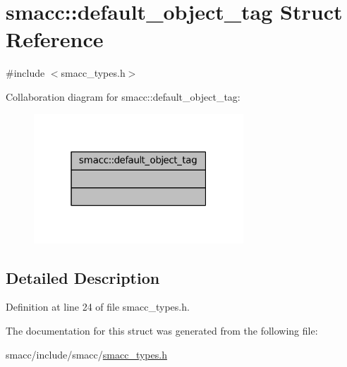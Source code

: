 \hypertarget{structsmacc_1_1default__object__tag}{}\section{smacc\+:\+:default\+\_\+object\+\_\+tag Struct Reference}
\label{structsmacc_1_1default__object__tag}


{\ttfamily \#include $<$smacc\+\_\+types.\+h$>$}



Collaboration diagram for smacc\+:\+:default\+\_\+object\+\_\+tag\+:
\nopagebreak
\begin{figure}[H]
\begin{center}
\leavevmode
\includegraphics[width=223pt]{structsmacc_1_1default__object__tag__coll__graph}
\end{center}
\end{figure}


\subsection{Detailed Description}


Definition at line 24 of file smacc\+\_\+types.\+h.



The documentation for this struct was generated from the following file\+:\begin{DoxyCompactItemize}
\item 
smacc/include/smacc/\hyperlink{smacc__types_8h}{smacc\+\_\+types.\+h}\end{DoxyCompactItemize}
